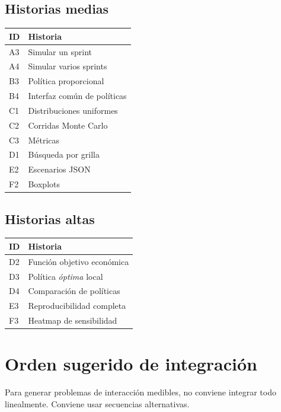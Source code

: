 \documentclass[11pt,a4paper]{article}
\begin{document}
\subsection{Historias medias}

\begin{table}[h!]
\centering
\begin{tabular}{ll}
\toprule
\textbf{ID} & \textbf{Historia} \\
\midrule
A3 & Simular un sprint \\
A4 & Simular varios sprints \\
B3 & Pol\'itica proporcional \\
B4 & Interfaz com\'un de pol\'iticas \\
C1 & Distribuciones uniformes \\
C2 & Corridas Monte Carlo \\
C3 & M\'etricas \\
D1 & B\'usqueda por grilla \\
E2 & Escenarios JSON \\
F2 & Boxplots \\
\bottomrule
\end{tabular}
\end{table}

\subsection{Historias altas}

\begin{table}[h!]
\centering
\begin{tabular}{ll}
\toprule
\textbf{ID} & \textbf{Historia} \\
\midrule
D2 & Funci\'on objetivo econ\'omica \\
D3 & Pol\'itica \textit{\'optima} local \\
D4 & Comparaci\'on de pol\'iticas \\
E3 & Reproducibilidad completa \\
F3 & Heatmap de sensibilidad \\
\bottomrule
\end{tabular}
\end{table}

\section{Orden sugerido de integraci\'on}

Para generar problemas de interacci\'on medibles, no conviene integrar todo linealmente. Conviene usar secuencias alternativas.
\end{document}
